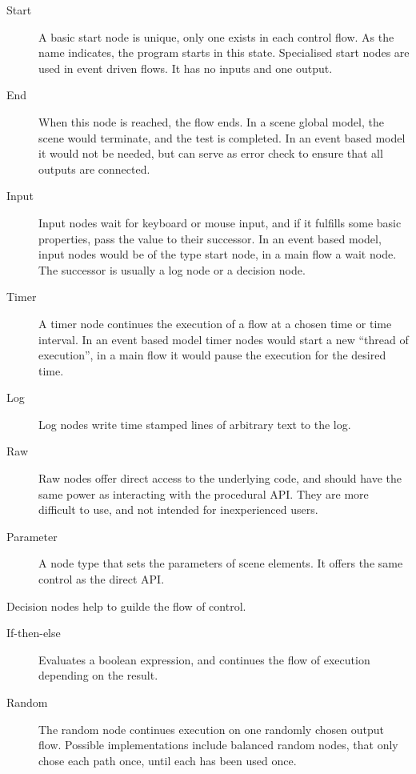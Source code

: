 \begin{description}
\item[Start]
A basic start node is unique, only one exists in each control flow.
As the name indicates, the program starts in this state.
Specialised start nodes are used in event driven flows.
It has no inputs and one output.

\item[End]
When this node is reached, the flow ends.
In a scene global model, the scene would terminate, and the test is completed.
In an event based model it would not be needed, but can serve as error check to ensure that all outputs are connected.

\item[Input]
Input nodes wait for keyboard or mouse input, and if it fulfills some basic properties, pass the value to their successor.
In an event based model, input nodes would be of the type start node, in a main flow a wait node.
The successor is usually a log node or a decision node.

\item[Timer]
A timer node continues the execution of a flow at a chosen time or time interval.
In an event based model timer nodes would start a new ``thread of execution'',
in a main flow it would pause the execution for the desired time.

\item[Log]
Log nodes write time stamped lines of arbitrary text to the log.

\item[Raw]
Raw nodes offer direct access to the underlying code, and should have the same power as interacting with the procedural API.
They are more difficult to use, and not intended for inexperienced users.

\item[Parameter]
A node type that sets the parameters of scene elements.
It offers the same control as the direct API.

\end{description}

Decision nodes help to guilde the flow of control.

\begin{description}
\item[If-then-else]
Evaluates a boolean expression, and continues the flow of execution depending on the result.

\item[Random]
The random node continues execution on one randomly chosen output flow.
Possible implementations include balanced random nodes, that only chose each path once, until each has been used once.

\end{description}


